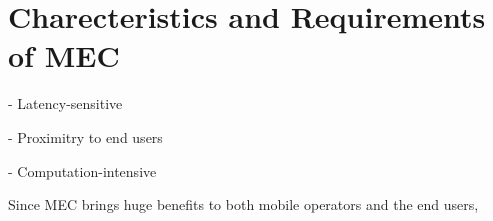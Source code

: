 \section{Charecteristics and Requirements of MEC}  \label{requirements}

- Latency-sensitive

- Proximitry to end users

- Computation-intensive

Since MEC brings huge benefits to both mobile operators and the end users, 
